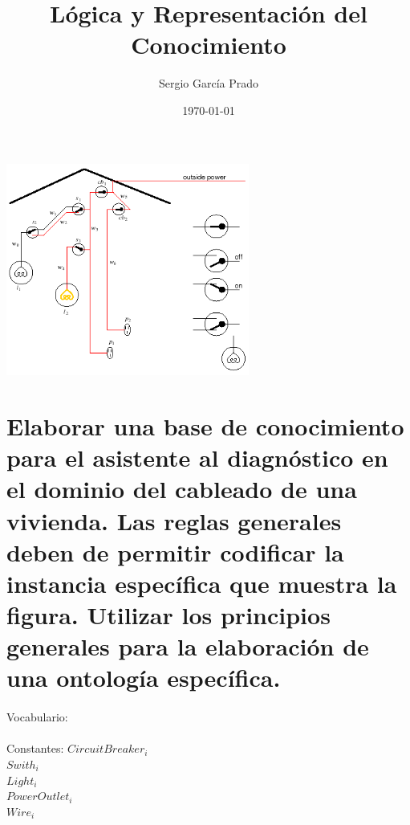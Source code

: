 \documentclass[10pt, a4paper,spanish]{article}
\title{\vspace{-15mm}\fontsize{24pt}{10pt}\selectfont\textbf{Lógica y Representación del Conocimiento}} %
\author{Sergio García Prado}
\date{\today}
\begin{document}
	\maketitle %

	\thispagestyle{fancy} %


	\begin{center}
		\includegraphics[width=0.6\textwidth]{diagnostic-assistant}
	\end{center}

	\section{Elaborar una base de conocimiento para el asistente al diagnóstico en el dominio del cableado de una vivienda. Las reglas generales deben de permitir codificar la instancia específica que muestra la figura. Utilizar los principios generales para la elaboración de una ontología específica.}


		\paragraph{}
		Vocabulario:

		\paragraph{}
		Constantes:
		$CircuitBreaker_i$ \\
		$Swith_i$ \\
		$Light_i$ \\
		$PowerOutlet_i$ \\
		$Wire_i$ \\
\end{document}
